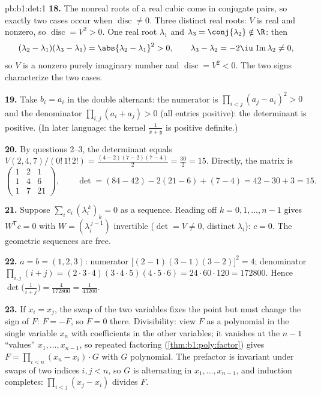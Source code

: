 \begin{solution}{pb:b1:det:1}
\textbf{18.} The nonreal roots of a real cubic come in conjugate
pairs, so exactly two cases occur when $\operatorname{disc} \neq
0$. Three distinct real roots: $V$ is real and nonzero, so
$\operatorname{disc} = V^2 > 0$. One real root $\lambda_1$ and
$\lambda_3 = \conj{\lambda_2} \notin \R$: then
\[
(\lambda_2 - \lambda_1)(\lambda_3 - \lambda_1) =
\abs{\lambda_2 - \lambda_1}^2 > 0,
\qquad
\lambda_3 - \lambda_2 = -2\iu\,\operatorname{Im}\lambda_2 \neq 0,
\]
so $V$ is a nonzero purely imaginary number and
$\operatorname{disc} = V^2 < 0$. The two signs characterize the
two cases.

\textbf{19.} Take $b_i = a_i$ in the double alternant: the
numerator is $\prod_{i<j}(a_j - a_i)^2 > 0$ and the denominator
$\prod_{i,j}(a_i + a_j) > 0$ (all entries positive): the
determinant is positive. (In later language: the kernel
$\frac1{x+y}$ is positive definite.)

\textbf{20.} By questions 2--3, the determinant equals
$V(2,4,7)/(0!\,1!\,2!) = \frac{(4-2)(7-2)(7-4)}{2} =
\frac{30}{2} = 15$. Directly, the matrix is
\[
\begin{pmatrix}
1 & 2 & 1\\
1 & 4 & 6\\
1 & 7 & 21
\end{pmatrix},
\qquad
\det = (84 - 42) - 2(21 - 6) + (7 - 4) = 42 - 30 + 3 = 15 .
\]

\textbf{21.} Suppose $\sum_i c_i\,(\lambda_i^{\,k})_{k} = 0$ as
a sequence. Reading off $k = 0, 1, \dots, n-1$ gives $W^{\mathsf
T}c = 0$ with $W = (\lambda_i^{\,j-1})$ invertible ($\det = V
\neq 0$, distinct $\lambda_i$): $c = 0$. The geometric sequences
are free.

\textbf{22.} $a = b = (1, 2, 3)$: numerator $\bigl[(2-1)(3-1)
(3-2)\bigr]^2 = 4$; denominator $\prod_{i,j}(i + j) =
(2\cdot3\cdot4)(3\cdot4\cdot5)(4\cdot5\cdot6) = 24\cdot60\cdot120
= 172800$. Hence $\det\bigl(\frac1{i+j}\bigr) = \frac{4}{172800}
= \frac1{43200}$.

\textbf{23.} If $x_i = x_j$, the swap of the two variables fixes
the point but must change the sign of $F$: $F = -F$, so $F = 0$
there. Divisibility: view $F$ as a polynomial in the single
variable $x_n$ with coefficients in the other variables; it
vanishes at the $n - 1$ ``values'' $x_1, \dots, x_{n-1}$, so
repeated factoring (\cref{thm:b1:poly:factor}) gives $F =
\prod_{i<n}(x_n - x_i)\cdot G$ with $G$ polynomial. The
prefactor is invariant under swaps of two indices $i, j < n$, so
$G$ is alternating in $x_1, \dots, x_{n-1}$, and induction
completes: $\prod_{i<j}(x_j - x_i)$ divides $F$.


\end{solution}
